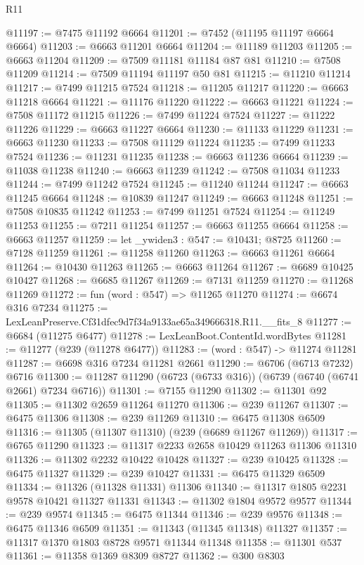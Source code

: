 \begin{lexlean}{R11}
\begin{coremodule}
@11197 := @7475 @11192 @6664
@11201 := @7452 (@11195 @11197 @6664 @6664)
@11203 := @6663 @11201 @6664
@11204 := @11189 @11203
@11205 := @6663 @11204
@11209 := @7509 @11181 @11184 @87 @81
@11210 := @7508 @11209
@11214 := @7509 @11194 @11197 @50 @81
@11215 := @11210 @11214
@11217 := @7499 @11215 @7524
@11218 := @11205 @11217
@11220 := @6663 @11218 @6664
@11221 := @11176 @11220
@11222 := @6663 @11221
@11224 := @7508 @11172 @11215
@11226 := @7499 @11224 @7524
@11227 := @11222 @11226
@11229 := @6663 @11227 @6664
@11230 := @11133 @11229
@11231 := @6663 @11230
@11233 := @7508 @11129 @11224
@11235 := @7499 @11233 @7524
@11236 := @11231 @11235
@11238 := @6663 @11236 @6664
@11239 := @11038 @11238
@11240 := @6663 @11239
@11242 := @7508 @11034 @11233
@11244 := @7499 @11242 @7524
@11245 := @11240 @11244
@11247 := @6663 @11245 @6664
@11248 := @10839 @11247
@11249 := @6663 @11248
@11251 := @7508 @10835 @11242
@11253 := @7499 @11251 @7524
@11254 := @11249 @11253
@11255 := @7211 @11254
@11257 := @6663 @11255 @6664
@11258 := @6663 @11257
@11259 := let _ywiden3 : @547 := @10431; @8725
@11260 := @7128 @11259
@11261 := @11258 @11260
@11263 := @6663 @11261 @6664
@11264 := @10430 @11263
@11265 := @6663 @11264
@11267 := @6689 @10425 @10427
@11268 := @6685 @11267
@11269 := @7131 @11259
@11270 := @11268 @11269
@11272 := fun (word : @547) => @11265 @11270
@11274 := @6674 @316 @7234
@11275 := LexLeanPreserve.Cf31dfec9d7f34a9133ae65a349666318.R11.__fits_8
@11277 := @6684 (@11275 @6477)
@11278 := LexLeanBoot.ContentId.wordBytes
@11281 := @11277 (@239 (@11278 @6477))
@11283 := (word : @547) -> @11274 @11281
@11287 := @6698 @316 @7234 @11281 @2661
@11290 := @6706 (@6713 @7232) @6716
@11300 := @11287 @11290 (@6723 (@6733 @316)) (@6739 (@6740 (@6741 @2661) @7234 @6716))
@11301 := @7155 @11290
@11302 := @11301 @92
@11305 := @11302 @2659 @11264 @11270
@11306 := @239 @11267
@11307 := @6475 @11306
@11308 := @239 @11269
@11310 := @6475 @11308 @6509
@11316 := @11305 (@11307 @11310) (@239 (@6689 @11267 @11269))
@11317 := @6765 @11290
@11323 := @11317 @2233 @2658 @10429 @11263 @11306 @11310
@11326 := @11302 @2232 @10422 @10428
@11327 := @239 @10425
@11328 := @6475 @11327
@11329 := @239 @10427
@11331 := @6475 @11329 @6509
@11334 := @11326 (@11328 @11331) @11306
@11340 := @11317 @1805 @2231 @9578 @10421 @11327 @11331
@11343 := @11302 @1804 @9572 @9577
@11344 := @239 @9574
@11345 := @6475 @11344
@11346 := @239 @9576
@11348 := @6475 @11346 @6509
@11351 := @11343 (@11345 @11348) @11327
@11357 := @11317 @1370 @1803 @8728 @9571 @11344 @11348
@11358 := @11301 @537
@11361 := @11358 @1369 @8309 @8727
@11362 := @300 @8303

\end{coremodule}
\end{lexlean}
